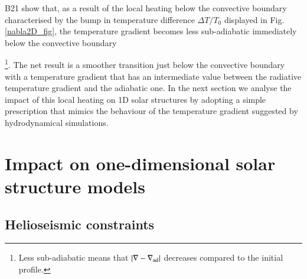 \documentclass[traditabstract]{aa}
\newcommand{\3}{\ss}
\begin{document}
B21 show that, as a result of the local heating below the convective boundary characterised by the bump in temperature difference $\Delta T/T_0$ displayed  in Fig. \ref{nabla2D_fig}, the temperature gradient  becomes less sub-adiabatic immediately below the convective boundary{\footnote{ Less sub-adiabatic means that $|\nabla - \nabla_{\rm ad}|$ decreases compared to the initial profile.}.  %
The net result is a smoother transition just below the convective boundary with a temperature gradient that has an intermediate value between the radiative temperature gradient and the adiabatic one. In the next section we analyse the impact of this local heating on 1D solar structures by adopting a simple prescription that mimics the behaviour of the temperature gradient suggested by hydrodynamical simulations. 


\section{Impact on one-dimensional solar structure models}
\label{1D}



\subsection{Helioseismic constraints}
\label{seismology}

}
\end{document}
